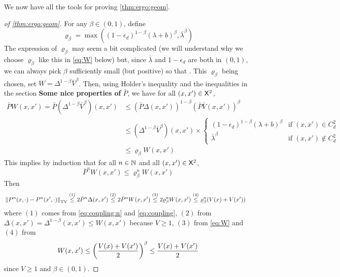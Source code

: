 \documentclass[english,graybox,envcountchap,envcountsame,sectrefs,shortlabels]{svmono}
\theoremstyle{style}
\newenvironment{svmultproof}{\small \begin{proof}}{\end{proof}}
\begin{document}
We now have all the tools for proving \autoref{thm:ergo:geom}.
\begin{svmultproof}[of  \autoref{thm:ergo:geom}]

For any $\beta\in (0,1)$, define
\begin{equation}
\varrho_\beta=\max((1-\epsilon_d)^{1-\beta} (\lambda +b)^\beta, \bar \lambda^{\beta})
\end{equation}
The expression of $\varrho_\beta$ may seem a bit complicated (we will understand why we choose $\varrho_\beta$ like this in \eqref{eq:W} below) but, since $\bar \lambda$ and $1-\epsilon_d$ are both in $(0,1)$, we can always pick $\beta$ sufficiently small (but positive) so that . This $\varrho_\beta$ being chosen, set $W=\Delta^{1-\beta} \bar V^\beta$.
Then, using Holder's inequality and the inequalities in the section \textbf{Some nice properties of} $\bar P$, we have for all $(x,x')\in\mathsf{X}^2$,
\begin{align*}
\bar PW(x,x')=\bar P(\Delta^{1-\beta} \bar V^\beta )(x,x') &\leq (\bar P \Delta (x,x'))^{1-\beta} (\bar P \bar V (x,x'))^\beta \\
& \leq (\Delta^{1-\beta} \bar V^\beta) (x,x') \times \begin{cases}
(1-\epsilon_d)^{1-\beta} (\lambda +b)^\beta &\mbox{if $(x,x')\in C_d^2$} \\
\bar \lambda^{\beta}  &\mbox{if $(x,x')\notin C_d^2$}
\end{cases}\\
&\leq \varrho_\beta  W (x,x')
\end{align*}
This implies by induction that for all $n\in\mathbb{N}$ and all $(x,x')\in\mathsf{X}^2$,
\begin{equation}\label{eq:W}
\bar P^nW(x,x') \leq \varrho^n_\beta  W (x,x')
\end{equation}
Then
\begin{align*}
& \left\|P^n(x,\cdot)-P^n(x',\cdot)\right\|_{\mathrm{TV}}  \stackrel{(1)}{\leq} 2 \bar P^n \Delta(x,x') \stackrel{(2)}{\leq} 2 \bar P^n W(x,x') \stackrel{(3)}{\leq} 2\varrho_\beta^n W(x,x') \stackrel{(4)}{\leq} \varrho_\beta^n (V(x)+V(x'))
\end{align*}
where $(1)$ comes from \eqref{eq:coupling:n} and \eqref{eq:coupling}, $(2)$ from  $\Delta(x,x')=\Delta^{1-\beta}(x,x')\leq W(x,x')$ because $V\geq 1$, $(3)$ from \eqref{eq:W}
and $(4)$ from
$$
W(x,x')\leq \left(\frac{V(x)+V(x')}{2}\right)^{\beta} \leq \frac{V(x)+V(x')}{2}
$$
since $V\geq 1$ and $\beta\in(0,1)$.
\end{svmultproof}
\end{document}
